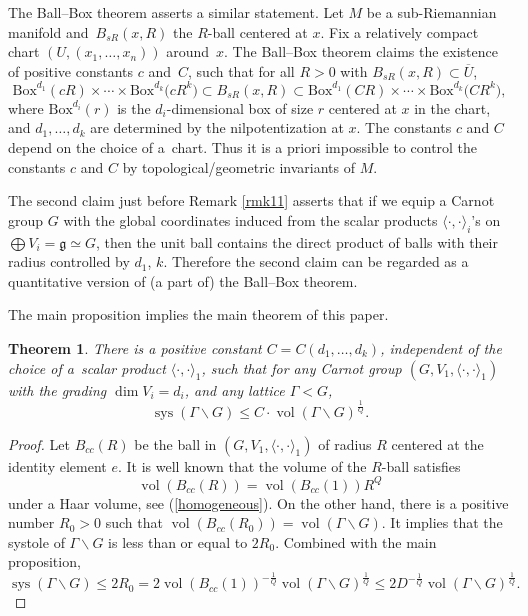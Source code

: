 \documentclass[10pt,a4paper]{amsart}
\numberwithin{equation}{section}
\newtheorem{Theorem}{Theorem}[section]
\newcommand{\g}{\mathfrak{g}}
\begin{document}
The Ball--Box theorem asserts a similar statement.
Let $M$ be a sub-Riemannian manifold and~$B_{sR}(x,R)$
the $R$-ball centered at $x$.
Fix a relatively compact chart $(U,(x_1,\dots,x_n))$ around~$x$.
The Ball--Box theorem claims the existence of positive constants $c$ and~$C$,
such that for all $R>0$ with $B_{sR}(x,R)\subset \overline{U}$,
\[
\mathrm{Box}^{d_1}(cR)\times \cdots\times \mathrm{Box}^{d_k}\big(cR^k\big)\subset B_{sR}(x,R)\subset \mathrm{Box}^{d_1}(CR)\times\cdots \times \mathrm{Box}^{d_k}\big(CR^k\big),
\]
where $\mathrm{Box}^{d_i}(r)$ is the $d_i$-dimensional box of size $r$ centered at $x$ in the chart,
and $d_1,\dots,d_k$ are determined by the nilpotentization at $x$.
The constants $c$ and $C$ depend on the choice of a~chart.
Thus it is a priori impossible to control the constants $c$ and $C$ by topological/geometric invariants of $M$.

The second claim just before Remark \ref{rmk11} asserts that if we equip a Carnot group $G$ with the global coordinates induced from the scalar products $\langle\cdot,\cdot\rangle_i$'s on $\bigoplus V_i=\g\simeq G$,
then the unit ball contains the direct product of balls with their radius controlled by $d_1$, $k$.
Therefore the second claim can be regarded as a quantitative version of (a part of) the Ball--Box theorem.

The main proposition implies the main theorem of this paper.


\begin{Theorem}\label{thmmain}
There is a positive constant $C=C(d_1,\dots,d_k)$,
independent of the choice of a~scalar product $\langle\cdot,\cdot\rangle_1$,
 such that for any Carnot group $(G,V_1,\langle\cdot,\cdot\rangle_1)$ with the grading $\dim V_i=d_i$,
and any lattice $\Gamma<G$,
\[
\operatorname{sys}(\Gamma\backslash G)\leq C\cdot \operatorname{vol}(\Gamma\backslash G)^{\frac{1}{Q}}.
\]
\end{Theorem}


\begin{proof}
Let $B_{cc}(R)$ be the ball in $(G,V_1,\langle\cdot,\cdot\rangle_1)$ of radius $R$ centered at
the identity element $e$.
It is well known that the volume of the $R$-ball satisfies
\[
\operatorname{vol}(B_{cc}(R))=\operatorname{vol}(B_{cc}(1))R^Q
\]
under a Haar volume,
see (\ref{homogeneous}).
On the other hand,
there is a positive number $R_0>0$ such that $\operatorname{vol}(B_{cc}(R_0))=\operatorname{vol}(\Gamma\backslash G)$.
It implies that the systole of $\Gamma\backslash G$ is less than or equal to $2R_0$.
Combined with the main proposition,
\[
\operatorname{sys}(\Gamma\backslash G)\leq 2R_0=2\operatorname{vol}(B_{cc}(1))^{-\frac{1}{Q}}\operatorname{vol}(\Gamma\backslash G)^{\frac{1}{Q}}\leq 2D^{-\frac{1}{Q}}\operatorname{vol}(\Gamma\backslash G)^{\frac{1}{Q}}.\tag*{\qed}
\]
\renewcommand{\qed}{}
\end{proof}
\end{document}
